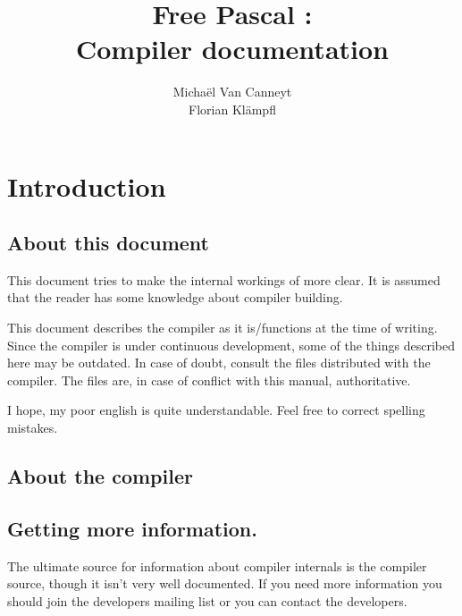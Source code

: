 \documentclass{report}
\begin{document}
\title{Free Pascal :\\ Compiler documentation}

\author{Micha\"el Van Canneyt\\Florian Kl\"ampfl}
\maketitle
\tableofcontents

\chapter{Introduction}

\section{About this document}

This document tries to make the internal workings of \fpc more clear.
It is assumed that the reader has some knowledge about compiler
building.

This document describes the compiler as it is/functions at the time of
writing. Since the compiler is under continuous development, some of the
things described here may be outdated. In case of doubt, consult the
 files distributed with the compiler.
The  files are, in case of conflict with this manual,
authoritative.

I hope, my poor english is quite understandable. Feel free to correct
spelling mistakes.

\section{About the compiler}

\section{Getting more information.}

The ultimate source for information about compiler internals is
the compiler source, though it isn't very well documented. If you
need more information you should join the developers mailing
list or you can contact the developers.
\end{document}
